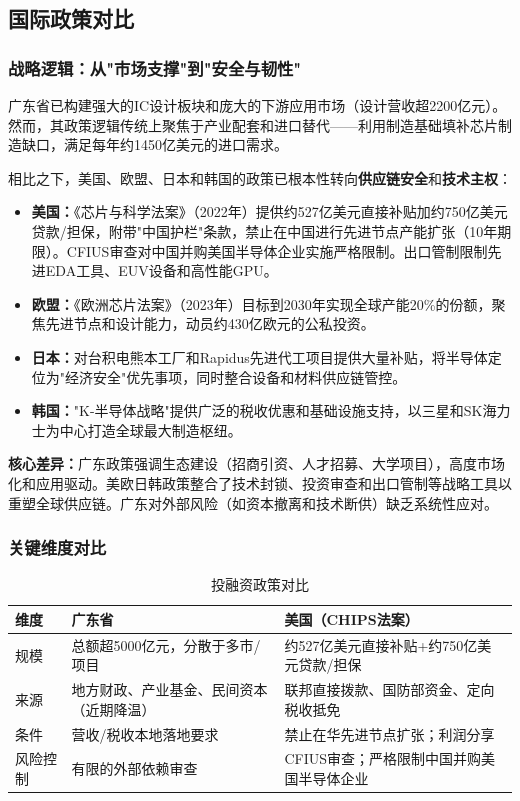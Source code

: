 \documentclass[12pt,a4paper]{article}
\newcommand{\tableHeaderRow}{\rowcolor{tealPrimary}\color{white}}
\newcommand{\tableOddRow}{\rowcolor{mintBG}}
\newcommand{\tableEvenRow}{\rowcolor{white}}
\begin{document}
\subsection{国际政策对比}
\label{sec:policy_comparison}

\subsubsection{战略逻辑：从"市场支撑"到"安全与韧性"}

广东省已构建强大的IC设计板块和庞大的下游应用市场（设计营收超2200亿元）。然而，其政策逻辑传统上聚焦于产业配套和进口替代——利用制造基础填补芯片制造缺口，满足每年约1450亿美元的进口需求。

相比之下，美国、欧盟、日本和韩国的政策已根本性转向\textbf{供应链安全}和\textbf{技术主权}：

\begin{itemize}
    \item \textbf{美国：}《芯片与科学法案》（2022年）提供约527亿美元直接补贴加约750亿美元贷款/担保，附带"中国护栏"条款，禁止在中国进行先进节点产能扩张（10年期限）。CFIUS审查对中国并购美国半导体企业实施严格限制。出口管制限制先进EDA工具、EUV设备和高性能GPU。
    \item \textbf{欧盟：}《欧洲芯片法案》（2023年）目标到2030年实现全球产能20\%的份额，聚焦先进节点和设计能力，动员约430亿欧元的公私投资。
    \item \textbf{日本：}对台积电熊本工厂和Rapidus先进代工项目提供大量补贴，将半导体定位为"经济安全"优先事项，同时整合设备和材料供应链管控。
    \item \textbf{韩国：}"K-半导体战略"提供广泛的税收优惠和基础设施支持，以三星和SK海力士为中心打造全球最大制造枢纽。
\end{itemize}

\textbf{核心差异：}广东政策强调生态建设（招商引资、人才招募、大学项目），高度市场化和应用驱动。美欧日韩政策整合了技术封锁、投资审查和出口管制等战略工具以重塑全球供应链。广东对外部风险（如资本撤离和技术断供）缺乏系统性应对。

\subsubsection{关键维度对比}

\begin{table}[H]
\centering
\caption{投融资政策对比}
\label{tab:policy_investment}
\begin{tabular}{p{2.5cm}p{5cm}p{5cm}}
\toprule
\tableHeaderRow
\textbf{维度} & \textbf{广东省} & \textbf{美国（CHIPS法案）} \\
\midrule
\tableOddRow 规模 & 总额超5000亿元，分散于多市/项目 & 约527亿美元直接补贴+约750亿美元贷款/担保 \\
\tableEvenRow 来源 & 地方财政、产业基金、民间资本（近期降温） & 联邦直接拨款、国防部资金、定向税收抵免 \\
\tableOddRow 条件 & 营收/税收本地落地要求 & 禁止在华先进节点扩张；利润分享 \\
\tableEvenRow 风险控制 & 有限的外部依赖审查 & CFIUS审查；严格限制中国并购美国半导体企业 \\
\bottomrule
\end{tabular}
\end{table}
\end{document}
